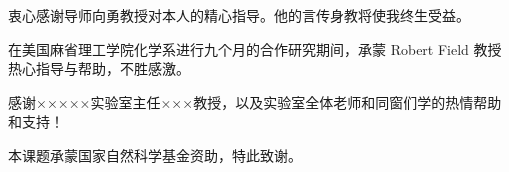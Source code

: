 
\begin{acknowledgements}
  衷心感谢导师向勇教授对本人的精心指导。他的言传身教将使我终生受益。

  在美国麻省理工学院化学系进行九个月的合作研究期间，承蒙 Robert Field 教授热心指导与帮助，不胜感激。

  感谢×××××实验室主任×××教授，以及实验室全体老师和同窗们学的热情帮助和支持！

  本课题承蒙国家自然科学基金资助，特此致谢。
\end{acknowledgements}
